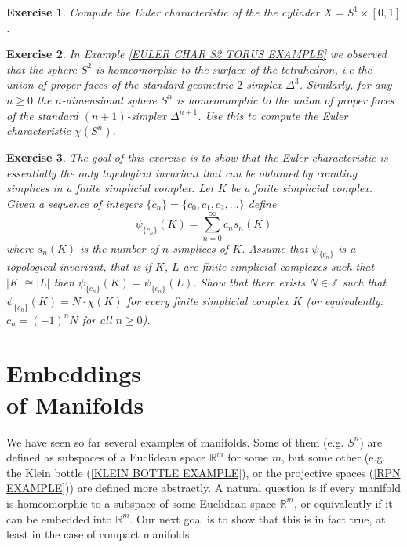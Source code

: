 \documentclass[11pt, letterpaper, oneside]{report}
\renewcommand{\chaptermark}[1]{\markboth{#1}{}}
\theoremstyle{pplain}
\newtheorem{ITERMVALUE THM}[theorem]{Intermediate Value Theorem}
\newtheorem{HEINEBOREL THM}[theorem]{Heine-Borel Theorem}
\newtheorem{UMETR THM}[theorem]{Urysohn Metrization Theorem}
\newtheorem{UMETR2 THM}[theorem]{Urysohn Metrization Theorem (v.2)}
\theoremstyle{ddefinition}
\theoremstyle{nnn}
\newtheorem{TDA NN}[theorem]{Topological Data Analysis. }
\theoremstyle{eexercise}
\newtheorem{exercise}{Exercise}[chapter]
\newcommand{\Z}{{\mathbb Z}}
\newcommand{\R}{{\mathbb R}}
\begin{document}
\begin{exercise}
Compute the Euler characteristic of the the cylinder $X = S^{1}\times [0, 1]$. 
\end{exercise}

\begin{exercise}
In Example \ref{EULER CHAR S2 TORUS EXAMPLE} we observed that the sphere $S^{2}$
is homeomorphic to the surface of the tetrahedron, i.e the union of proper faces of the standard geometric
$2$-simplex $\Delta^{3}$. Similarly, for any $n\geq 0$ the $n$-dimensional sphere $S^{n}$ is 
homeomorphic to the union of proper faces of the standard $(n+1)$-simplex $\Delta^{n+1}$. Use this to compute 
the Euler characteristic $\chi(S^{n})$. 
\end{exercise}

\begin{exercise}
The goal of this exercise is to show that the Euler characteristic is essentially the only topological 
invariant that can be obtained by counting simplices in a finite simplicial complex. 
Let $K$ be a finite simplicial complex. Given a sequence of integers  $\{c_{n}\} = \{ c_{0}, c_{1}, c_{2}, \dots \}$ 
define
$$\psi_{\{c_{n}\}}(K) = \sum_{n=0}^{\infty} c_{n}s_{n}(K)$$
where $s_{n}(K)$ is the number of $n$-simplices of $K$.  
Assume that $\psi_{\{c_{n}\}}$ is a topological invariant, that is if $K$, $L$ are finite simplicial complexes 
such that $|K| \cong |L|$ then $\psi_{\{c_{n}\}}(K) = \psi_{\{c_{n}\}}(L)$. 
Show that there exists $N\in \Z$ such that $\psi_{\{c_{n}\}}(K) = N\cdot \chi(K)$ for every finite 
simplicial complex $K$ (or equivalently: $c_{n} = (-1)^{n} N$ for all $n\geq 0$). 
\end{exercise}


\newpage

\chapter[Embeddings of Manifolds]{Embeddings \\ of  Manifolds}

\chaptermark{Embedding of Manifolds}

\thispagestyle{firststyle}

We have seen so far several examples of manifolds. Some of them (e.g. $S^{n}$)
are defined as subspaces of a Euclidean space $\R^{m}$ for some $m$, but some 
other (e.g. the Klein bottle (\ref{KLEIN BOTTLE EXAMPLE}), or  the projective spaces 
(\ref{RPN EXAMPLE})) are defined more abstractly. A natural question is if every 
manifold is homeomorphic to a subspace of some Euclidean space $\R^{m}$, or equivalently 
if it can be embedded into $\R^{m}$. Our next goal is to show that this is in fact true, at least 
in the case of compact manifolds. 
\end{document}
